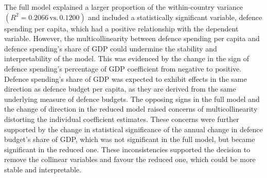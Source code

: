 The full model explained a larger proportion of the within-country variance 
$(R^2 = 0.2066\, \text{vs.} \,0.1200)$
and included a statistically significant variable, defence spending per capita, which had a positive 
relationship with the dependent variable. However, the multicollinearity between defence spending per 
capita and defence spending's share of GDP could undermine the stability and interpretability 
of the model. This was evidenced by the change in the sign of defence spending's percentage of GDP 
coefficient from negative to positive. Defence spending's share of GDP was expected to exhibit 
effects in the same direction as defence budget per capita, as they are derived from the same underlying 
measure of defence budgets. The opposing signs in the full model and the change of direction in the 
reduced model raised concerns of multicollinearity distorting the individual coefficient estimates.
These concerns were further supported by the change in statistical significance of the annual change in defence budget's share of GDP, which was not significant in the full model, but became significant in 
the reduced one.
These inconsistencies supported the decision to remove the collinear variables and favour the reduced 
one, which could be more stable and interpretable.

\renewcommand{\arraystretch}{1.3}

\begin{table}[ht]
\small
\caption{Robustness check}
\centering
{}
\label{tab:robustness}
\end{table}

